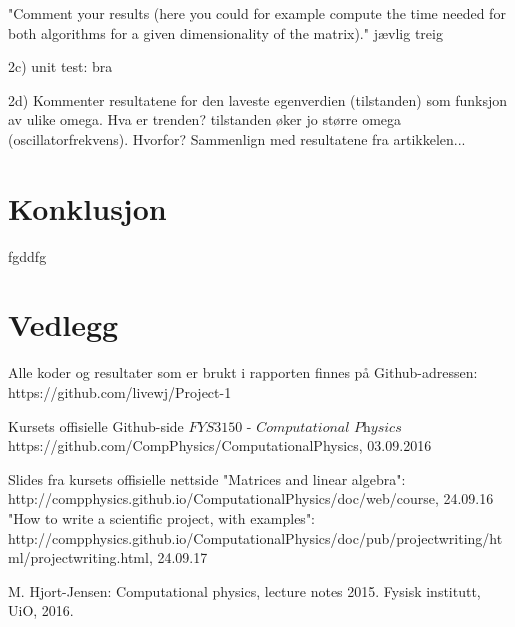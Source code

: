 \documentclass{article}
\begin{document}
 "Comment your results (here you could for example compute the time needed for both algorithms for a given dimensionality of the matrix)."
 jævlig treig
 
 2c) unit test: bra
 
 2d) Kommenter resultatene for den laveste egenverdien (tilstanden) som funksjon av ulike omega. Hva er trenden? tilstanden øker jo større omega (oscillatorfrekvens). Hvorfor? 
 Sammenlign med resultatene fra artikkelen...
 

\section{Konklusjon}
fgddfg


\section{Vedlegg}
Alle koder og resultater som er brukt i rapporten finnes på Github-adressen: https://github.com/livewj/Project-1




\begin{thebibliography}{9}

  Kursets offisielle Github-side $\textit{FYS3150 - Computational Physics}$
  https://github.com/CompPhysics/ComputationalPhysics,
  03.09.2016  
  
\bibitem{}
  Slides fra kursets offisielle nettside
  "Matrices and linear algebra":
   http://compphysics.github.io/ComputationalPhysics/doc/web/course, 24.09.16
  "How to write a scientific project, with examples":
  http://compphysics.github.io/ComputationalPhysics/doc/pub/projectwriting/html/projectwriting.html, 24.09.17
   
\bibitem{}
   M. Hjort-Jensen: Computational physics, lecture notes 2015. Fysisk institutt, UiO, 2016.

   
\end{thebibliography}
\end{document}
